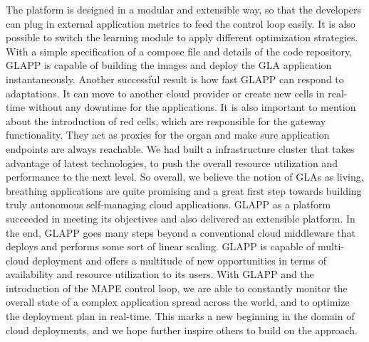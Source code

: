 \documentclass{seal_thesis}
\begin{document}
The platform is designed in a modular and extensible way, so that the developers can plug in external application metrics to feed the control loop easily.
It is also possible to switch the learning module to apply different optimization strategies.
With a simple specification of a compose file and details of the code repository, GLAPP is capable of building the images and deploy the GLA application instantaneously.
Another successful result is how fast GLAPP can respond to adaptations.
It can move to another cloud provider or create new cells in real-time without any downtime for the applications.
It is also important to mention about the introduction of red cells, which are responsible for the gateway functionality.
They act as proxies for the organ and make sure application endpoints are always reachable.
We had built a infrastructure cluster that takes advantage of latest technologies, to push the overall resource utilization and performance to the next level.
So overall, we believe the notion of GLAs as living, breathing applications are quite promising and a great first step towards building truly autonomous self-managing cloud applications. 
GLAPP as a platform succeeded in meeting its objectives and also delivered an extensible platform.
In the end, GLAPP goes many steps beyond a conventional cloud middleware that deploys and performs some sort of linear scaling.
GLAPP is capable of multi-cloud deployment and offers a multitude of new opportunities in terms of availability and resource utilization to its users.
With GLAPP and the introduction of the MAPE control loop, we are able to constantly monitor the overall state of a complex application spread across the world, and to optimize the deployment plan in real-time. 
This marks a new beginning in the domain of cloud deployments, and we hope further inspire others to build on the approach.




\end{document}
